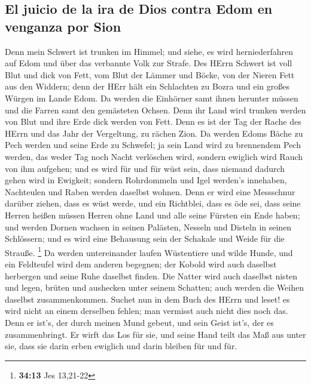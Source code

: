 \hypertarget{el-juicio-de-la-ira-de-dios-contra-edom-en-venganza-por-sion}{%
\subsection{El juicio de la ira de Dios contra Edom en venganza por
Sion}\label{el-juicio-de-la-ira-de-dios-contra-edom-en-venganza-por-sion}}

 Denn mein Schwert ist trunken im Himmel; und siehe, es
wird herniederfahren auf Edom und über das verbannte Volk zur Strafe.
 Des HErrn Schwert ist voll Blut und dick von Fett, vom
Blut der Lämmer und Böcke, von der Nieren Fett aus den Widdern; denn der
HErr hält ein Schlachten zu Bozra und ein großes Würgen im Lande Edom.
 Da werden die Einhörner samt ihnen herunter müssen und
die Farren samt den gemästeten Ochsen. Denn ihr Land wird trunken werden
von Blut und ihre Erde dick werden von Fett.  Denn es ist
der Tag der Rache des HErrn und das Jahr der Vergeltung, zu rächen Zion.
 Da werden Edoms Bäche zu Pech werden und seine Erde zu
Schwefel; ja sein Land wird zu brennendem Pech werden, 
das weder Tag noch Nacht verlöschen wird, sondern ewiglich wird Rauch
von ihm aufgehen; und es wird für und für wüst sein, dass niemand
dadurch gehen wird in Ewigkeit;  sondern Rohrdommeln und
Igel werden's innehaben, Nachteulen und Raben werden daselbst wohnen.
Denn er wird eine Messschnur darüber ziehen, dass es wüst werde, und ein
Richtblei, dass es öde sei,  dass seine Herren heißen
müssen Herren ohne Land und alle seine Fürsten ein Ende haben;
 und werden Dornen wachsen in seinen Palästen, Nesseln
und Disteln in seinen Schlössern; und es wird eine Behausung sein der
Schakale und Weide für die Strauße. \footnote{\textbf{34:13} Jes
  13,21-22}  Da werden untereinander laufen Wüstentiere
und wilde Hunde, und ein Feldteufel wird dem anderen begegnen; der
Kobold wird auch daselbst herbergen und seine Ruhe daselbst finden.
 Die Natter wird auch daselbst nisten und legen, brüten
und aushecken unter seinem Schatten; auch werden die Weihen daselbst
zusammenkommen.  Suchet nun in dem Buch des HErrn und
leset! es wird nicht an einem derselben fehlen; man vermisst auch nicht
dies noch das. Denn er ist's, der durch meinen Mund gebeut, und sein
Geist ist's, der es zusammenbringt.  Er wirft das Los für
sie, und seine Hand teilt das Maß aus unter sie, dass sie darin erben
ewiglich und darin bleiben für und für.


